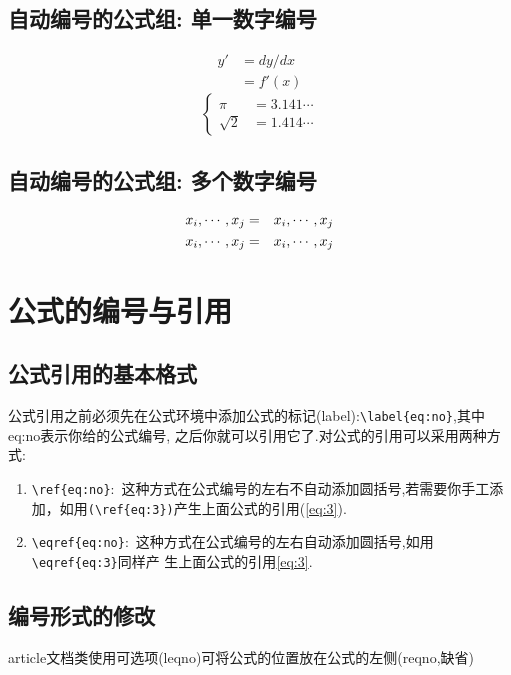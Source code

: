 \subsection{自动编号的公式组:  单一数字编号}
\begin{equation} \label{eq:2}
\begin{split}
y'&= dy / dx \\
 &= f'(x)
 \end{split}
 \end{equation}
\begin{equation} \label{eq:3}
\left\{ \begin{aligned}
         \pi &= 3.141\cdots \\
     \sqrt{2}&=1.414\cdots
        \end{aligned} \right.
\end{equation}
\subsection{自动编号的公式组:  多个数字编号}
\begin{eqnarray}
  x_{i},\cdots,x_{j} &=& x_{i},\cdots,x_{j} \\
  x_{i},\cdots,x_{j} &=& x_{i},\cdots,x_{j}
\end{eqnarray}

\section{公式的编号与引用}
\subsection{公式引用的基本格式}
公式引用之前必须先在公式环境中添加公式的标记(label):\verb+\label{eq:no}+,其中eq:no表示你给的公式编号,
之后你就可以引用它了.对公式的引用可以采用两种方式:
\begin{enumerate}
\item \verb+\ref{eq:no}+:~这种方式在公式编号的左右不自动添加圆括号,若需要你手工添加，如用\verb+(\ref{eq:3})+产生上面公式的引用(\ref{eq:3}).
\item \verb+\eqref{eq:no}+:~这种方式在公式编号的左右自动添加圆括号,如用\verb+\eqref{eq:3}+同样产
生上面公式的引用\eqref{eq:3}.
\end{enumerate}
\subsection{编号形式的修改}
article文档类使用可选项(leqno)可将公式的位置放在公式的左侧(reqno,缺省)

